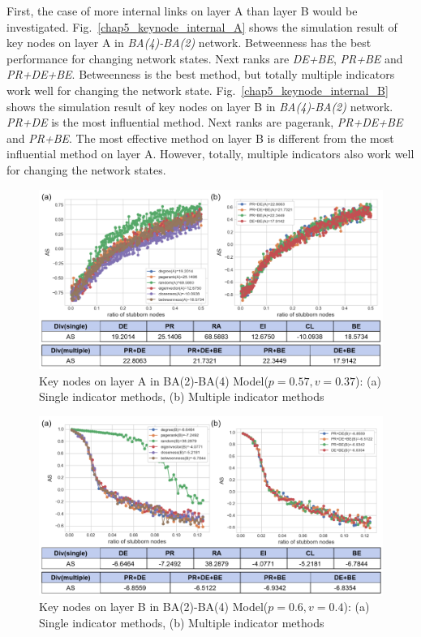 First, the case of more internal links on layer A than layer B would be investigated. 
Fig.~\ref{chap5_keynode_internal_A} shows the simulation result of key nodes on layer A in \textit{BA(4)-BA(2)} network. Betweenness has the best performance for changing network states. Next ranks are \textit{DE+BE}, \textit{PR+BE} and \textit{PR+DE+BE}. Betweenness is the best method, but totally multiple indicators work well for changing the network state.  
Fig.~\ref{chap5_keynode_internal_B} shows the simulation result of key nodes on layer B in \textit{BA(4)-BA(2)} network. \textit{PR+DE} is the most influential method. Next ranks are pagerank, \textit{PR+DE+BE} and \textit{PR+BE}. The most effective method on layer B is different from the most influential method on layer A. However, totally, multiple indicators also work well for changing the network states.  
\begin{figure}[!htb]
	\centering
	\includegraphics[width=\hsize]{figure/chap5_keynode_internal_A2.png}
	\caption{Key nodes on layer A in BA(2)-BA(4) Model($p=0.57, v=0.37$):
		(a) Single indicator methods, (b) Multiple indicator methods}
	\label{chap5_keynode_internal_A2}
\end{figure}
\begin{figure}[!htb]
	\centering
	\includegraphics[width=\hsize]{figure/chap5_keynode_internal_B2.png}
	\caption{Key nodes on layer B in BA(2)-BA(4) Model($p=0.6, v=0.4$):
		(a) Single indicator methods, (b) Multiple indicator methods}
	\label{chap5_keynode_internal_B2}
\end{figure}

